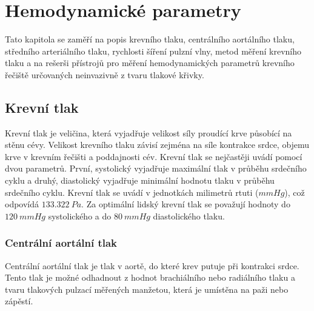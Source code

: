 \chapter{Hemodynamické parametry}
Tato kapitola se zaměří na popis krevního tlaku, centrálního aortálního tlaku, středního arteriálního tlaku, rychlosti šíření pulzní vlny, metod měření krevního tlaku a na rešerši přístrojů pro měření hemodynamických parametrů krevního řečiště určovaných neinvazivně z tvaru tlakové křivky.
\section{Krevní tlak}
Krevní tlak je veličina, která vyjadřuje velikost síly proudící krve působící na stěnu cévy. Velikost krevního tlaku závisí zejména na síle kontrakce srdce, objemu krve v krevním řečišti a
poddajnosti cév. Krevní tlak se nejčastěji uvádí pomocí dvou parametrů. První, systolický vyjadřuje maximální tlak v průběhu srdečního cyklu
a druhý, diastolický vyjadřuje minimální hodnotu tlaku v průběhu srdečního cyklu. Krevní tlak se uvádí v jednotkách milimetrů rtuti ($mmHg$), což odpovídá $133.322 \ Pa$. Za optimální lidský krevní tlak se považují hodnoty do $120 \ mmHg$ systolického a do $80 \ mmHg$ diastolického tlaku.
\cite{cite:BP}

\subsection{Centrální aortální tlak}
Centrální aortální tlak je tlak v aortě, do které krev putuje při kontrakci srdce.
Tento tlak je možné odhadnout z hodnot brachiálního nebo radiálního tlaku a tvaru tlakových pulzací měřených manžetou, která je umístěna na paži nebo zápěstí.\cite{cite:CBP}

